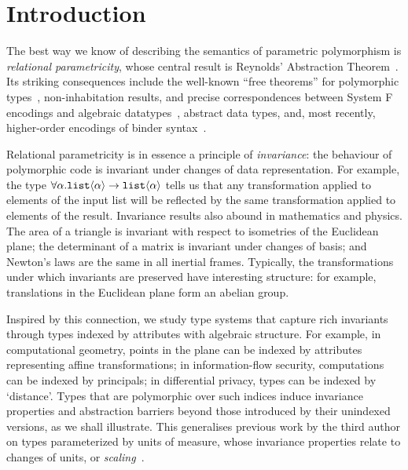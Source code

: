 \section{Introduction}
\label{sec:introduction}
The best way we know of describing the semantics of parametric
polymorphism is \emph{relational parametricity}, whose central result
is Reynolds' Abstraction Theorem~\cite{reynolds83types}. Its striking
consequences include the well-known ``free theorems'' for polymorphic
types~\cite{wadler89theorems}, non-inhabitation results, and precise
correspondences between System F encodings and algebraic
datatypes~\cite{PittsAM:parpoe}, abstract data types, and, most
recently, higher-order encodings of binder
syntax~\cite{syntaxforfree}.

Relational parametricity is in essence a principle of
\emph{invariance}: the behaviour of polymorphic code is invariant
under changes of data representation. For example, the type
$\forall\alpha.\textup{\texttt{list}}\langle \alpha \rangle\to\textup{\texttt{list}}\langle \alpha \rangle$
tells us that any transformation applied to elements of
the input list will be reflected by the same transformation applied
to elements of the result. 
Invariance results also abound in
mathematics and physics. The area of a triangle is invariant with
respect to isometries of the Euclidean plane; the determinant of a
matrix is invariant under changes of basis; and Newton's laws are the
same in all inertial frames. Typically, the 
transformations under which invariants are preserved have interesting structure: 
for example, translations in
the Euclidean plane form an abelian group.

Inspired by this connection, we study type systems that
capture rich invariants through types indexed by attributes with
algebraic structure.  For example, in computational geometry, points
in the plane can be indexed by attributes representing affine
transformations; in information-flow security, computations can be
indexed by principals; in differential privacy, types can be indexed
by `distance'. Types that are polymorphic over such indices induce
invariance properties and abstraction barriers beyond those introduced
by their unindexed versions, as we shall illustrate.  This generalises
previous work by the third author on types parameterized by
units of measure, whose invariance properties relate to changes of
units, or \emph{scaling}~\cite{kennedy97relational}.

